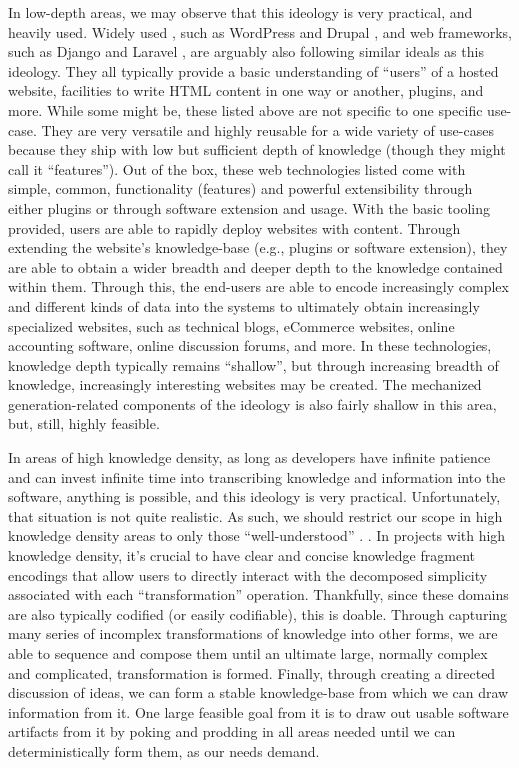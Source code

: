 In low-depth areas, we may observe that this ideology is very practical, and
heavily used. Widely used , such as WordPress \cite{WordPress} and
Drupal , and web frameworks, such as Django  and Laravel
, are arguably also following similar ideals as this ideology. They
all typically provide a basic understanding of ``users'' of a hosted website,
facilities to write HTML content in one way or another, plugins, and more. While
some might be, these listed above are not specific to one specific use-case.
They are very versatile and highly reusable for a wide variety of use-cases
because they ship with low but sufficient depth of knowledge (though they might
call it ``features''). Out of the box, these web technologies listed come with
simple, common, functionality (features) and powerful extensibility through
either plugins or through software extension and usage. With the basic tooling
provided, users are able to rapidly deploy websites with content. Through
extending the website's knowledge-base (e.g., plugins or software extension),
they are able to obtain a wider breadth and deeper depth to the knowledge
contained within them. Through this, the end-users are able to encode
increasingly complex and different kinds of data into the systems to ultimately
obtain increasingly specialized websites, such as technical blogs, eCommerce
websites, online accounting software, online discussion forums, and more. In
these technologies, knowledge depth typically remains ``shallow'', but through
increasing breadth of knowledge, increasingly interesting websites may be
created. The mechanized generation-related components of the ideology is also
fairly shallow in this area, but, still, highly feasible.

In areas of high knowledge density, as long as developers have infinite patience
and can invest infinite time into transcribing knowledge and information into
the software, anything is possible, and this ideology is very practical.
Unfortunately, that situation is not quite realistic. As such, we should
restrict our scope in high knowledge density areas to only those
``well-understood'' \cite{well-understood}. . In
projects with high knowledge density, it's crucial to have clear and concise
knowledge fragment encodings that allow users to directly interact with the
decomposed simplicity associated with each ``transformation'' operation.
Thankfully, since these domains are also typically codified (or easily
codifiable), this is doable. Through capturing many series of incomplex
transformations of knowledge into other forms, we are able to sequence and
compose them until an ultimate large, normally complex and complicated,
transformation is formed. Finally, through creating a directed discussion of
ideas, we can form a stable knowledge-base from which we can draw information
from it. One large feasible goal from it is to draw out usable software
artifacts from it by poking and prodding in all areas needed until we can
deterministically form them, as our needs demand.
